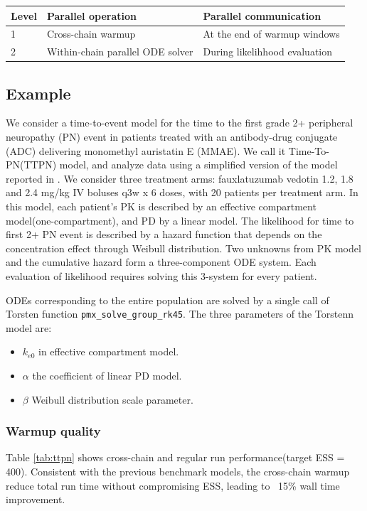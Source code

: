 \documentclass[landscape,a0paper,fontscale=0.45]{baposter} %
\begin{document}
\begin{poster}
{\begin{multicols}{2}
\begin{center}
\begin{tabular}{l l l}
\hline
Level & Parallel operation & Parallel communication \\
\hline
1 & Cross-chain warmup & At the end of warmup windows \\
2 & Within-chain parallel ODE solver & During likelihhood evaluation \\
\hline
\end{tabular}
\end{center}

\subsection*{Example}
We consider a time-to-event model for the time to the first grade 2+ peripheral neuropathy (PN)
event in patients treated with an antibody-drug conjugate (ADC)
delivering monomethyl auristatin E (MMAE). We call it
Time-To-PN(TTPN) model, and analyze data using a
simplified version of the model reported in
\cite{lu_time--event_2017}. We consider three treatment arms:
fauxlatuzumab vedotin 1.2, 1.8 and 2.4 mg/kg IV boluses q3w x 6 doses,
with 20 patients per treatment arm. In this model,
each patient's PK is described by an effective compartment model(one-compartment),
and PD by a linear model. The likelihood for time to first 2+ PN event
is described by a hazard function that depends on the concentration
effect through Weibull distribution. Two unknowns from
PK model and the cumulative hazard form a three-component
ODE system. Each evaluation of likelihood requires solving this
3-system for every patient. 

ODEs corresponding to the entire
population are solved by a single call of Torsten function \texttt{\texttt{pmx\_solve\_group\_rk45}}. The three parameters of the
Torstenn model are:
\begin{itemize}
\item \(k_{e0}\) in effective compartment model.
\item \(\alpha\) the coefficient of linear PD model.
\item \(\beta\) Weibull distribution scale parameter.
\end{itemize}

\subsubsection*{Warmup quality}
Table \ref{tab:ttpn} shows cross-chain and
regular run performance(target ESS = 400). Consistent with the
previous benchmark models, the cross-chain warmup reduce total run time without
compromising ESS, leading to ~15\% wall time improvement.


\end{multicols}}
\end{poster}
\end{document}
